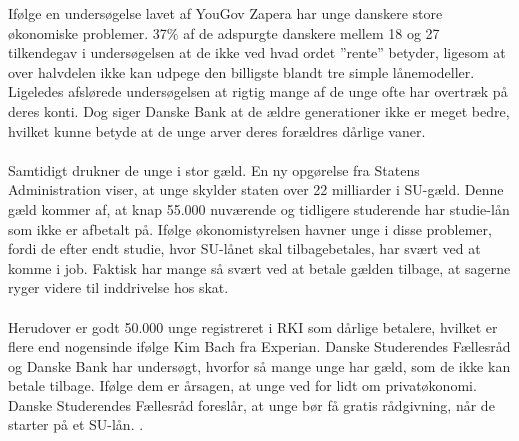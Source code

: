 
Ifølge en undersøgelse lavet af YouGov Zapera \cite{DanskeB1} har unge danskere store økonomiske problemer. 37\% af de adspurgte danskere mellem 18 og 27 tilkendegav i undersøgelsen at de ikke ved hvad ordet ”rente” betyder, ligesom at over halvdelen ikke kan udpege den billigste blandt tre simple lånemodeller. Ligeledes afslørede undersøgelsen at rigtig mange af de unge ofte har overtræk på deres konti. Dog siger Danske Bank at de ældre generationer ikke er meget bedre, hvilket kunne betyde at de unge arver deres forældres dårlige vaner.  \\
\\
Samtidigt drukner de unge i stor gæld. En ny opgørelse fra Statens Administration viser, at unge skylder staten over 22 milliarder i SU-gæld. Denne gæld kommer af, at knap 55.000\cite{dr.dk} nuværende og tidligere studerende har studie-lån som ikke er afbetalt på. Ifølge økonomistyrelsen havner unge i disse problemer, fordi de efter endt studie, hvor SU-lånet skal tilbagebetales, har svært ved at komme i job\cite{jobindex}. Faktisk har mange så svært ved at betale gælden tilbage, at sagerne ryger videre til inddrivelse hos skat\cite{BusinessDK1}.\\
\\
Herudover er godt 50.000 unge registreret i RKI som dårlige betalere, hvilket er flere end nogensinde ifølge Kim Bach fra Experian. Danske Studerendes Fællesråd og Danske Bank har undersøgt, hvorfor så mange unge har gæld, som de ikke kan betale tilbage. Ifølge dem er årsagen, at unge ved for lidt om privatøkonomi. Danske Studerendes Fællesråd foreslår, at unge bør få gratis rådgivning, når de starter på et SU-lån. \cite{dr.dk}.
